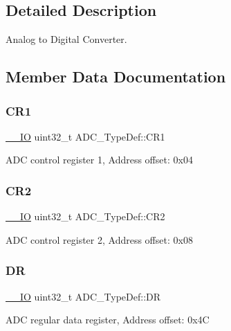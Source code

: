 \subsection{Detailed Description}
Analog to Digital Converter. 

\subsection{Member Data Documentation}
\mbox{\label{struct_a_d_c___type_def_a89b1ff4376683dd2896ea8b32ded05b2}} 
\subsubsection{\texorpdfstring{CR1}{CR1}}
{\footnotesize\ttfamily \mbox{\hyperlink{core__sc300_8h_aec43007d9998a0a0e01faede4133d6be}{\+\_\+\+\_\+\+IO}} uint32\+\_\+t A\+D\+C\+\_\+\+Type\+Def\+::\+C\+R1}

A\+DC control register 1, Address offset\+: 0x04 \mbox{\label{struct_a_d_c___type_def_a1053a65a21af0d27afe1bf9cf7b7aca7}} 
\subsubsection{\texorpdfstring{CR2}{CR2}}
{\footnotesize\ttfamily \mbox{\hyperlink{core__sc300_8h_aec43007d9998a0a0e01faede4133d6be}{\+\_\+\+\_\+\+IO}} uint32\+\_\+t A\+D\+C\+\_\+\+Type\+Def\+::\+C\+R2}

A\+DC control register 2, Address offset\+: 0x08 \mbox{\label{struct_a_d_c___type_def_a84114accead82bd11a0e12a429cdfed9}} 
\subsubsection{\texorpdfstring{DR}{DR}}
{\footnotesize\ttfamily \mbox{\hyperlink{core__sc300_8h_aec43007d9998a0a0e01faede4133d6be}{\+\_\+\+\_\+\+IO}} uint32\+\_\+t A\+D\+C\+\_\+\+Type\+Def\+::\+DR}

A\+DC regular data register, Address offset\+: 0x4C \mbox{\label{struct_a_d_c___type_def_a297ac2d83a1837bfdc0333474b977de0}} 
